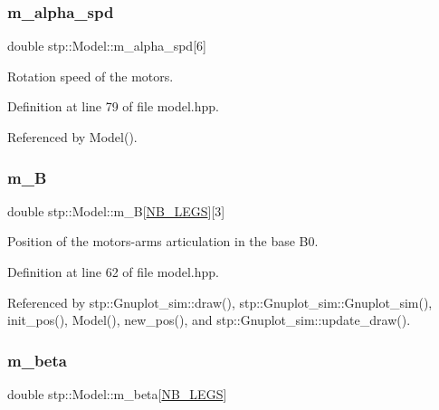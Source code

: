 \subsubsection{\texorpdfstring{m\+\_\+alpha\+\_\+spd}{m\_alpha\_spd}}
{\footnotesize\ttfamily double stp\+::\+Model\+::m\+\_\+alpha\+\_\+spd\mbox{[}6\mbox{]}\hspace{0.3cm}{\ttfamily [protected]}}

Rotation speed of the motors. 

Definition at line 79 of file model.\+hpp.



Referenced by Model().

\mbox{\label{classstp_1_1_model_ad1f36bbb9a3f9aac7054b991bb02fe70}} 
\subsubsection{\texorpdfstring{m\+\_\+B}{m\_B}}
{\footnotesize\ttfamily double stp\+::\+Model\+::m\+\_\+B\mbox{[}\hyperlink{model_8hpp_ae44092ed043cb4350e2df47fdee890b9}{N\+B\+\_\+\+L\+E\+GS}\mbox{]}\mbox{[}3\mbox{]}\hspace{0.3cm}{\ttfamily [protected]}}

Position of the motors-\/arms articulation in the base B0. 

Definition at line 62 of file model.\+hpp.



Referenced by stp\+::\+Gnuplot\+\_\+sim\+::draw(), stp\+::\+Gnuplot\+\_\+sim\+::\+Gnuplot\+\_\+sim(), init\+\_\+pos(), Model(), new\+\_\+pos(), and stp\+::\+Gnuplot\+\_\+sim\+::update\+\_\+draw().

\mbox{\label{classstp_1_1_model_a0dde329f8445840075590404c4f2c0de}} 
\subsubsection{\texorpdfstring{m\+\_\+beta}{m\_beta}}
{\footnotesize\ttfamily double stp\+::\+Model\+::m\+\_\+beta\mbox{[}\hyperlink{model_8hpp_ae44092ed043cb4350e2df47fdee890b9}{N\+B\+\_\+\+L\+E\+GS}\mbox{]}\hspace{0.3cm}{\ttfamily [protected]}}

